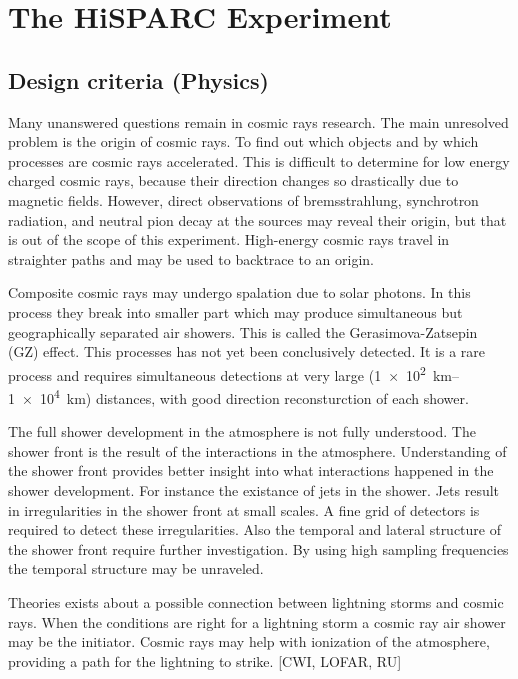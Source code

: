 \chapter{The HiSPARC Experiment}

\section{Design criteria (Physics)}

Many unanswered questions remain in cosmic rays research. The main unresolved problem is the origin of cosmic rays. To find out which objects and by which processes are cosmic rays accelerated. This is difficult to determine for low energy charged cosmic rays, because their direction changes so drastically due to magnetic fields. However, direct observations of bremsstrahlung, synchrotron radiation, and neutral pion decay at the sources may reveal their origin, but that is out of the scope of this experiment. High-energy cosmic rays travel in straighter paths and may be used to backtrace to an origin.

Composite cosmic rays may undergo spalation due to solar photons. In this process they break into smaller part which may produce simultaneous but geographically separated air showers. This is called the Gerasimova-Zatsepin (GZ) effect. This processes has not yet been conclusively detected. It is a rare process and requires simultaneous detections at very large (\SIrange{1e2}{1e4}{\kilo\meter}) distances, with good direction reconsturction of each shower.

The full shower development in the atmosphere is not fully understood. The shower front is the result of the interactions in the atmosphere. Understanding of the shower front provides better insight into what interactions happened in the shower development. For instance the existance of jets in the shower. Jets result in irregularities in the shower front at small scales. A fine grid of detectors is required to detect these irregularities. Also the temporal and lateral structure of the shower front require further investigation. By using high sampling frequencies the temporal structure may be unraveled.

Theories exists about a possible connection between lightning storms and cosmic rays. When the conditions are right for a lightning storm a cosmic ray air shower may be the initiator. Cosmic rays may help with ionization of the atmosphere, providing a path for the lightning to strike. [CWI, LOFAR, RU]

